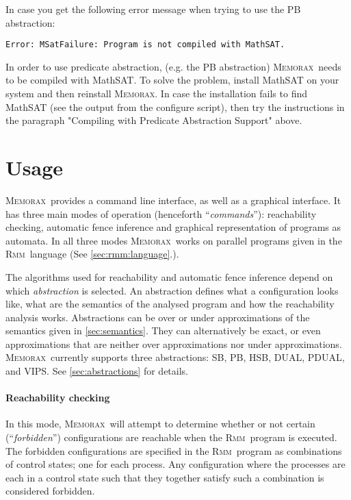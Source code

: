 \documentclass[a4paper]{article}
\newcommand{\memorax}{\textsc{Memorax}}
\newcommand{\rmm}{\textsc{Rmm}}
\begin{document}
   In case you get the following error message when trying to use the
   PB abstraction:

\begin{verbatim}
Error: MSatFailure: Program is not compiled with MathSAT.
\end{verbatim}

   In order to use predicate abstraction, (e.g. the PB abstraction)
   \memorax\ needs to be compiled with MathSAT. To solve the problem,
   install MathSAT on your system and then reinstall \memorax. In case
   the installation fails to find MathSAT (see the output from the
   configure script), then try the instructions in the paragraph
   "Compiling with Predicate Abstraction Support" above.

\section{Usage}\label{sec:usage}

\memorax\ provides a command line interface, as well as a graphical
interface. It has three main modes of operation (henceforth
``\emph{commands}''): reachability checking, automatic fence inference
and graphical representation of programs as automata. In all three
modes \memorax\ works on parallel programs given in the \rmm\ language
(See \cref{sec:rmm:language}.).

The algorithms used for reachability and automatic fence inference
depend on which \emph{abstraction} is selected. An abstraction defines
what a configuration looks like, what are the semantics of the
analysed program and how the reachability analysis works. Abstractions
can be over or under approximations of the semantics given in
\cref{sec:semantics}. They can alternatively be exact, or even
approximations that are neither over approximations nor under
approximations. \memorax\ currently supports three abstractions: SB,
PB, HSB, DUAL, PDUAL, and VIPS. See \cref{sec:abstractions} for details.

\paragraph{Reachability checking}
 In this mode, \memorax\ will attempt to determine whether or not
 certain (``\emph{forbidden}'') configurations are reachable when the
 \rmm\ program is executed. The forbidden configurations are specified
 in the \rmm\ program as combinations of control states; one for each
 process. Any configuration where the processes are each in a control
 state such that they together satisfy such a combination is
 considered forbidden.
\end{document}
